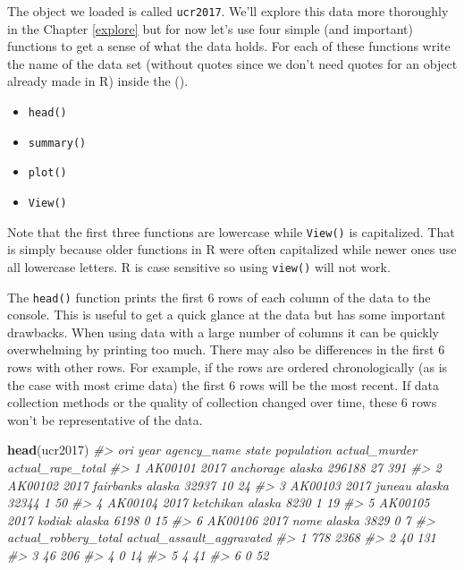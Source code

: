 \documentclass[
  12pt,
]{book}
\newenvironment{Shaded}{\begin{snugshade}}{\end{snugshade}}
\newcommand{\CommentTok}[1]{\textcolor[rgb]{0.37,0.37,0.37}{\textit{#1}}}
\newcommand{\KeywordTok}[1]{\textcolor[rgb]{0.27,0.27,0.27}{\textbf{#1}}}
\newcommand{\NormalTok}[1]{#1}
\providecommand{\tightlist}{%
  \setlength{\itemsep}{0pt}\setlength{\parskip}{0pt}}
\begin{document}
The object we loaded is called \texttt{ucr2017}. We'll explore this data more thoroughly in the Chapter \ref{explore} but for now let's use four simple (and important) functions to get a sense of what the data holds. For each of these functions write the name of the data set (without quotes since we don't need quotes for an object already made in R) inside the ().

\begin{itemize}
\tightlist
\item
  \texttt{head()}
\item
  \texttt{summary()}
\item
  \texttt{plot()}
\item
  \texttt{View()}
\end{itemize}

Note that the first three functions are lowercase while \texttt{View()} is capitalized. That is simply because older functions in R were often capitalized while newer ones use all lowercase letters. R is case sensitive so using \texttt{view()} will not work.

The \texttt{head()} function prints the first 6 rows of each column of the data to the console. This is useful to get a quick glance at the data but has some important drawbacks. When using data with a large number of columns it can be quickly overwhelming by printing too much. There may also be differences in the first 6 rows with other rows. For example, if the rows are ordered chronologically (as is the case with most crime data) the first 6 rows will be the most recent. If data collection methods or the quality of collection changed over time, these 6 rows won't be representative of the data.

\begin{Shaded}
\begin{Highlighting}[]
\KeywordTok{head}\NormalTok{(ucr2017)}
\CommentTok{\#>       ori year agency\_name  state population actual\_murder actual\_rape\_total}
\CommentTok{\#> 1 AK00101 2017   anchorage alaska     296188            27               391}
\CommentTok{\#> 2 AK00102 2017   fairbanks alaska      32937            10                24}
\CommentTok{\#> 3 AK00103 2017      juneau alaska      32344             1                50}
\CommentTok{\#> 4 AK00104 2017   ketchikan alaska       8230             1                19}
\CommentTok{\#> 5 AK00105 2017      kodiak alaska       6198             0                15}
\CommentTok{\#> 6 AK00106 2017        nome alaska       3829             0                 7}
\CommentTok{\#>   actual\_robbery\_total actual\_assault\_aggravated}
\CommentTok{\#> 1                  778                      2368}
\CommentTok{\#> 2                   40                       131}
\CommentTok{\#> 3                   46                       206}
\CommentTok{\#> 4                    0                        14}
\CommentTok{\#> 5                    4                        41}
\CommentTok{\#> 6                    0                        52}
\end{Highlighting}
\end{Shaded}
\end{document}
